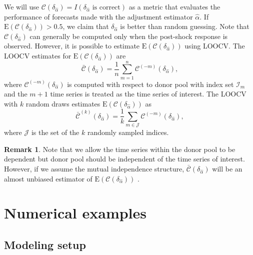 \documentclass[11pt,3p,review,authoryear]{elsarticle}
\def\mc#1{\mathcal{#1}} %
\def\E#1{\mathrm{E}(#1)} %
\theoremstyle{definition}
\newtheorem{remark}{Remark}
\begin{document}
We will use 
$
	\mc{C}(\delta_{\hat\alpha}) 
	= I(\delta_{\hat{\alpha}} \text{ is correct})
$
as a metric that evaluates the performance of forecasts made with the adjustment estimator $\hat\alpha$. If $\E{\mc{C}(\delta_{\hat{\alpha}})} > 0.5$, we claim that $\delta_{\hat{\alpha}}$ is better than random guessing. Note that $\mc{C}(\delta_{\hat{\alpha}})$ can generally be computed only when the post-shock response is observed. However, it is possible to estimate $\E{\mc{C}(\delta_{\hat{\alpha}})}$ using LOOCV. 
The LOOCV estimates for $\E{\mc{C}(\delta_{\hat{\alpha}})}$ are
\begin{equation} \label{loocvm}
	 \bar{\mc{C}}(\delta_{\hat{\alpha}})= \frac{1}{n} \sum_{m = 1}^n \mc{C}^{(-m)}(\delta_{\hat{\alpha}}),
	\end{equation}
where $\mc{C}^{(-m)}(\delta_{\hat{\alpha}})$ is computed with respect to donor pool with index set $\mc{I}_m$ and the $m+1$ time series is treated as the time series of interest.  The LOOCV with $k$ random draws estimates $\E{\mc{C}(\delta_{\hat{\alpha}})}$ as
\begin{equation} \label{loocvk}
	 \bar{\mc{C}}^{(k)}(\delta_{\hat{\alpha}})= \frac{1}{k} \sum_{m \in \mc{J}} \mc{C} ^{(-m)}(\delta_{\hat{\alpha}})	,
\end{equation}
where $\mc{J}$ is the set of the $k$ randomly sampled indices. 

\begin{remark}
  Note that we allow the time series within the donor pool to be dependent but donor pool should be independent of the time series of interest. However, if we assume the mutual  independence structure, $\bar{\mc{C}}(\delta_{\hat{\alpha}})$ will be an almost unbiased estimator of $\E{\mc{C}(\delta_{\hat{\alpha}})}$ \citep[Page 222]{msos}. 
\end{remark}



\section{Numerical examples}
\label{simulation}

\subsection{Modeling setup}
\end{document}
